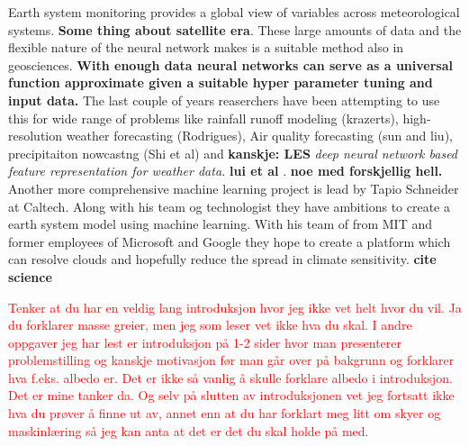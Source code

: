 Earth system monitoring provides a global view of variables across meteorological systems. \textbf{Some thing about satellite era}. These large amounts of data and the flexible nature of the neural network makes is a suitable method also in geosciences. \textbf{With enough data neural networks can serve as a universal function approximate given a suitable hyper parameter tuning and input data.} The last couple of years reaserchers have been attempting to use this for wide range of problems like rainfall runoff modeling (krazerts), high-resolution weather forecasting (Rodrigues), Air quality forecasting (sun and liu), precipitaiton nowcastng (Shi et al) and \textbf{kanskje: LES} \textit{deep neural network based feature representation for weather data.} \textbf{lui et al }. \textbf{noe med forskjellig hell.} Another more comprehensive machine learning project is lead by Tapio Schneider at Caltech. Along with his team og technologist they have ambitions to create a earth system model using machine learning. With his team of from MIT and former employees of Microsoft and Google they hope to create a platform which can resolve clouds and hopefully reduce the spread in climate sensitivity. \textbf{cite science}

\textcolor{red}{Tenker at du har en veldig lang introduksjon hvor jeg ikke vet helt hvor du vil. Ja du forklarer masse greier, men jeg som leser vet ikke hva du skal. I andre oppgaver jeg har lest er introduksjon på 1-2 sider hvor man presenterer problemstilling og kanskje motivasjon før man går over på bakgrunn og forklarer hva f.eks. albedo er. Det er ikke så vanlig å skulle forklare albedo i introduksjon. Det er mine tanker da. Og selv på slutten av introduksjonen vet jeg fortsatt ikke hva du prøver å finne ut av, annet enn at du har forklart meg litt om skyer og maskinlæring så jeg kan anta at det er det du skal holde på med. }
